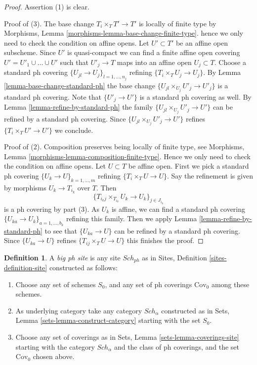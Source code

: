\documentclass{stacks-project}
\theoremstyle{plain}
\theoremstyle{definition}
\newtheorem{definition}[subsection]{Definition}
\theoremstyle{remark}
\numberwithin{equation}{subsection}
\def\Sch{\mathit{Sch}}
\begin{document}
\begin{proof}
Assertion (1) is clear.

\medskip\noindent
Proof of (3). The base change $T_i \times_T T' \to T'$ is
locally of finite type by
Morphisms, Lemma \ref{morphisms-lemma-base-change-finite-type}.
hence we only need to check the condition on affine opens.
Let $U' \subset T'$ be an affine open subscheme.
Since $U'$ is quasi-compact we can find a finite affine open
covering $U' = U'_1 \cup \ldots \cup U'$ such that
$U'_j \to T$ maps into an affine open $U_j \subset T$.
Choose a standard ph covering $\{U_{jl} \to U_j\}_{l = 1, \ldots, n_j}$
refining $\{T_i \times_T U_j \to U_j\}$.
By Lemma \ref{lemma-base-change-standard-ph}
the base change $\{U_{jl} \times_{U_j} U'_j \to U'_j\}$
is a standard ph covering. Note that $\{U'_j \to U'\}$
is a standard ph covering as well.
By Lemma \ref{lemma-refine-by-standard-ph} 
the family $\{U_{jl} \times_{U_j} U'_j \to U'\}$
can be refined by a standard ph covering. Since
$\{U_{jl} \times_{U_j} U'_j \to U'\}$ refines $\{T_i \times_T U' \to U'\}$
we conclude.

\medskip\noindent
Proof of (2). Composition preserves being locally of finite type,
see Morphisms, Lemma \ref{morphisms-lemma-composition-finite-type}.
Hence we only need to check the condition on affine opens.
Let $U \subset T$ be affine open. First we pick a standard ph covering
$\{U_k \to U\}_{k = 1, \ldots, m}$ refining
$\{T_i \times_T U \to U\}$.
Say the refinement is given by morphisms $U_k \to T_{i_k}$ over $T$.
Then
$$
\{T_{i_kj} \times_{T_{i_k}} U_k \to U_k\}_{j \in J_{i_k}}
$$
is a ph covering by part (3). As $U_k$ is affine,
we can find a standard ph covering
$\{U_{ka} \to U_k\}_{a = 1, \ldots, b_k}$ refining this family.
Then we apply Lemma \ref{lemma-refine-by-standard-ph}
to see that $\{U_{ka} \to U\}$ can be refined by a
standard ph covering. Since $\{U_{ka} \to U\}$
refines $\{T_{ij} \times_T U \to U\}$ this finishes the proof.
\end{proof}

\begin{definition}
\label{definition-big-ph-site}
A {\it big ph site} is any site $\Sch_{ph}$ as in
Sites, Definition \ref{sites-definition-site} constructed as follows:
\begin{enumerate}
\item Choose any set of schemes $S_0$, and any set of ph coverings
$\text{Cov}_0$ among these schemes.
\item As underlying category take any category $\Sch_\alpha$
constructed as in Sets, Lemma \ref{sets-lemma-construct-category}
starting with the set $S_0$.
\item Choose any set of coverings as in
Sets, Lemma \ref{sets-lemma-coverings-site} starting with the
category $\Sch_\alpha$ and the class of ph coverings,
and the set $\text{Cov}_0$ chosen above.
\end{enumerate}
\end{definition}
\end{document}
